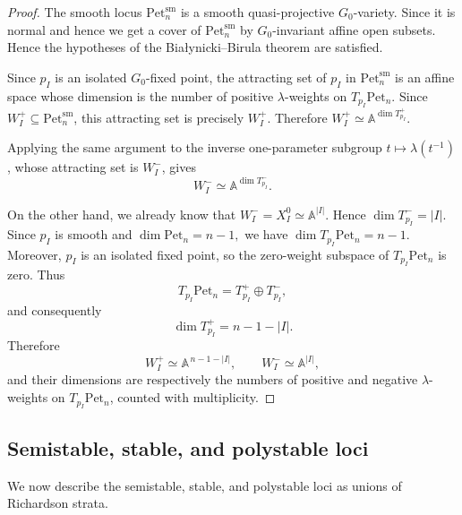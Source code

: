 \documentclass[12pt, reqno]{amsart}
\theoremstyle{plain}
\numberwithin{equation}{section}
\theoremstyle{definition}
\begin{document}
\begin{proof}
The smooth locus \(\mathrm{Pet}_n^{\mathrm{sm}}\) is a smooth
quasi-projective \(G_0\)-variety. Since it is normal and hence we get a cover of \(\mathrm{Pet}_n^{\mathrm{sm}}\) by
\(G_0\)-invariant affine open subsets. Hence the hypotheses of the
Bia{\l}ynicki--Birula theorem
\cite[Theorem~4.1]{BB}
are satisfied.

Since \(p_I\) is an isolated \(G_0\)-fixed point, the attracting set of
\(p_I\) in \(\mathrm{Pet}_n^{\mathrm{sm}}\) is an affine space whose
dimension is the number of positive \(\lambda\)-weights on
\(T_{p_I}\mathrm{Pet}_n\). Since
\(W_I^+\subseteq\mathrm{Pet}_n^{\mathrm{sm}}\), this attracting set is
precisely \(W_I^+\). Therefore $W_I^+
\simeq
\mathbb A^{\dim T_{p_I}^+}.$

Applying the same argument to the inverse one-parameter subgroup
\(t\mapsto\lambda(t^{-1})\), whose attracting set is \(W_I^-\), gives
\[
W_I^-
\simeq
\mathbb A^{\dim T_{p_I}^-}.
\]

On the other hand, we already know that $W_I^-=X_I^0\simeq\mathbb A^{|I|}.$ Hence $\dim T_{p_I}^-=|I|.$
Since \(p_I\) is smooth and $\dim\mathrm{Pet}_n=n-1,$
we have $\dim T_{p_I}\mathrm{Pet}_n=n-1.$
Moreover, \(p_I\) is an isolated fixed point, so the zero-weight
subspace of \(T_{p_I}\mathrm{Pet}_n\) is zero. Thus
\[
T_{p_I}\mathrm{Pet}_n
=
T_{p_I}^+\oplus T_{p_I}^-,
\]
and consequently
\[
\dim T_{p_I}^+
=
n-1-|I|.
\]
Therefore 
\[
W_I^+
\simeq\mathbb A^{\,n-1-|I|},
\qquad
W_I^-
\simeq\mathbb A^{|I|},
\]
and their dimensions are respectively the numbers of positive and
negative \(\lambda\)-weights on
\(T_{p_I}\mathrm{Pet}_n\), counted with multiplicity.
\end{proof}

\subsection{Semistable, stable, and polystable loci}

We now describe the semistable, stable, and polystable loci as unions
of Richardson strata.
\end{document}
